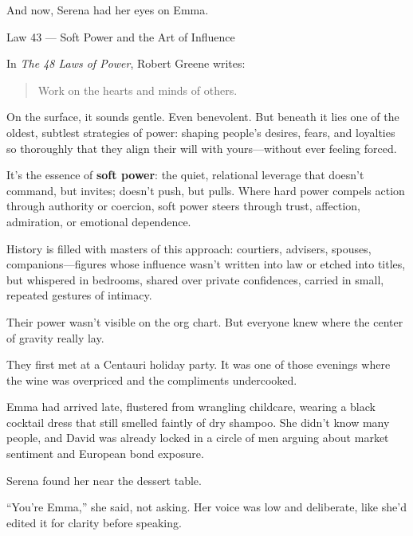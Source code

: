 And now, Serena had her eyes on Emma.

\medskip

\begin{PhilosophicalSidebar}{Law 43 --- Soft Power and the Art of Influence}

  In \textit{The 48 Laws of Power}, Robert Greene writes:
  
  \begin{quote}
    Work on the hearts and minds of others.
  \end{quote}
  
  On the surface, it sounds gentle. Even benevolent. But beneath it lies one of the oldest, subtlest strategies of 
  power: shaping people’s desires, fears, and loyalties so thoroughly that they align their will with yours—without 
  ever feeling forced.

  \medskip

  It’s the essence of \textbf{soft power}: the quiet, relational leverage that doesn’t command, but invites; doesn’t 
  push, but pulls. Where hard power compels action through authority or coercion, soft power steers through trust, 
  affection, admiration, or emotional dependence.
  
  \medskip
  
  History is filled with masters of this approach: courtiers, advisers, spouses, companions—figures whose influence 
  wasn’t written into law or etched into titles, but whispered in bedrooms, shared over private confidences, carried 
  in small, repeated gestures of intimacy.

  \medskip
  
  Their power wasn’t visible on the org chart.  But everyone knew where the center of gravity really lay.
  
\end{PhilosophicalSidebar}

\medskip

They first met at a Centauri holiday party. It was one of those evenings where the wine was overpriced and 
the compliments undercooked.

Emma had arrived late, flustered from wrangling childcare, wearing a black cocktail dress that still 
smelled faintly of dry shampoo. She didn’t know many people, and David was already locked in a circle of 
men arguing about market sentiment and European bond exposure.

Serena found her near the dessert table.

``You’re Emma,'' she said, not asking. Her voice was low and deliberate, like she’d edited it for 
clarity before speaking.

